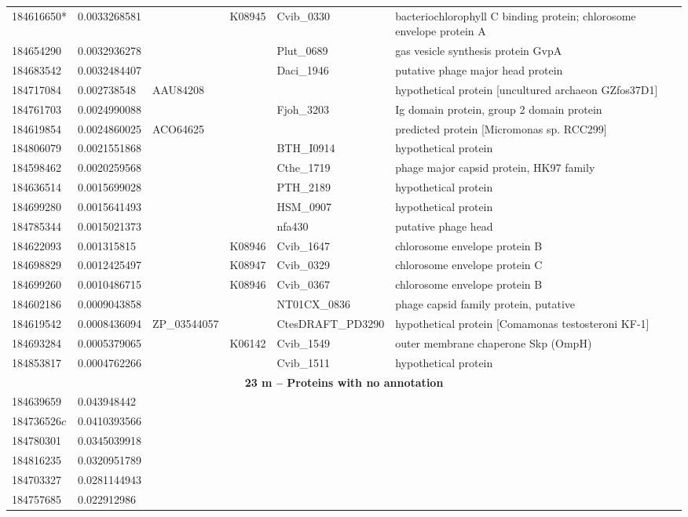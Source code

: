 \begin{landscape}
\begin{longtable}{p{1.8cm}p{2cm}p{2.2cm}p{1cm}p{2.8cm}p{12.3cm}}
184616650*&0.0033268581&&K08945&Cvib\_0330&bacteriochlorophyll C binding protein; chlorosome envelope protein A \\
184654290&0.0032936278&&&Plut\_0689&gas vesicle synthesis protein GvpA \\
184683542&0.0032484407&&&Daci\_1946&putative phage major head protein \\
184717084&0.002738548&AAU84208&&&hypothetical protein  [uncultured archaeon GZfos37D1] \\
184761703&0.0024990088&&&Fjoh\_3203&Ig domain protein, group 2 domain protein \\
184619854&0.0024860025&ACO64625&&&predicted protein [Micromonas sp. RCC299] \\
184806079&0.0021551868&&&BTH\_I0914&hypothetical protein \\
184598462&0.0020259568&&&Cthe\_1719&phage major capsid protein, HK97 family \\
184636514&0.0015699028&&&PTH\_2189&hypothetical protein \\
184699280&0.0015641493&&&HSM\_0907&hypothetical protein \\
184785344&0.0015021373&&&nfa430&putative phage head \\
184622093&0.001315815&&K08946&Cvib\_1647&chlorosome envelope protein B \\
184698829&0.0012425497&&K08947&Cvib\_0329&chlorosome envelope protein C \\
184699260&0.0010486715&&K08946&Cvib\_0367&chlorosome envelope protein B \\
184602186&0.0009043858&&&NT01CX\_0836&phage capsid family protein, putative \\
184619542&0.0008436094&ZP\_03544057&&CtesDRAFT\_PD3290&hypothetical protein  [Comamonas testosteroni KF-1] \\
184693284&0.0005379065&&K06142&Cvib\_1549&outer membrane chaperone Skp (OmpH) \\
184853817&0.0004762266&&&Cvib\_1511&hypothetical protein \\
\toprule
\multicolumn{6}{c}{\textbf{23 m -- Proteins with no annotation}} \\
\midrule
184639659&0.043948442&&&& \\
184736526$c$&0.0410393566&&&& \\
184780301&0.0345039918&&&& \\
184816235&0.0320951789&&&& \\
184703327&0.0281144943&&&& \\
184757685&0.022912986&&&& \\

\end{longtable}
\end{landscape}
